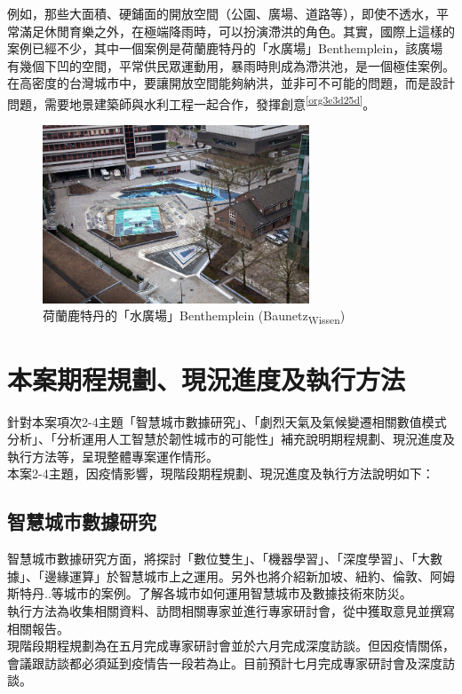 \documentclass[a4paper,12pt]{article}
\begin{document}
例如，那些大面積、硬鋪面的開放空間（公園、廣場、道路等），即使不透水，平常滿足休閒育樂之外，在極端降雨時，可以扮演滯洪的角色。其實，國際上這樣的案例已經不少，其中一個案例是荷蘭鹿特丹的「水廣場」Benthemplein，該廣場有幾個下凹的空間，平常供民眾運動用，暴雨時則成為滯洪池，是一個極佳案例。在高密度的台灣城市中，要讓開放空間能夠納洪，並非可不可能的問題，而是設計問題，需要地景建築師與水利工程一起合作，發揮創意\textsuperscript{\ref{org3e3d25d}}。\\

\begin{figure}[htbp]
\centering
\includegraphics[width=300]{images/161236830025147_P3592665.jpg}
\caption{\label{fig:Benthemplein}荷蘭鹿特丹的「水廣場」Benthemplein (Baunetz\textsubscript{Wissen})}
\end{figure}
\newpage

\section{本案期程規劃、現況進度及執行方法}
\label{sec:orgd01f57d}
針對本案項次2-4主題「智慧城市數據研究」、「劇烈天氣及氣候變遷相關數值模式分析」、「分析運用人工智慧於韌性城市的可能性」補充說明期程規劃、現況進度及執行方法等，呈現整體專案運作情形。\\

本案2-4主題，因疫情影響，現階段期程規劃、現況進度及執行方法說明如下：\\
\subsection{智慧城市數據研究}
\label{sec:orgf720300}
智慧城市數據研究方面，將探討「數位雙生」、「機器學習」、「深度學習」、「大數據」、「邊緣運算」於智慧城市上之運用。另外也將介紹新加坡、紐約、倫敦、阿姆斯特丹..等城市的案例。了解各城市如何運用智慧城市及數據技術來防災。\\
執行方法為收集相關資料、訪問相關專家並進行專家研討會，從中獲取意見並撰寫相關報告。\\
現階段期程規劃為在五月完成專家研討會並於六月完成深度訪談。但因疫情關係，會議跟訪談都必須延到疫情告一段若為止。目前預計七月完成專家研討會及深度訪談。\\
\end{document}
